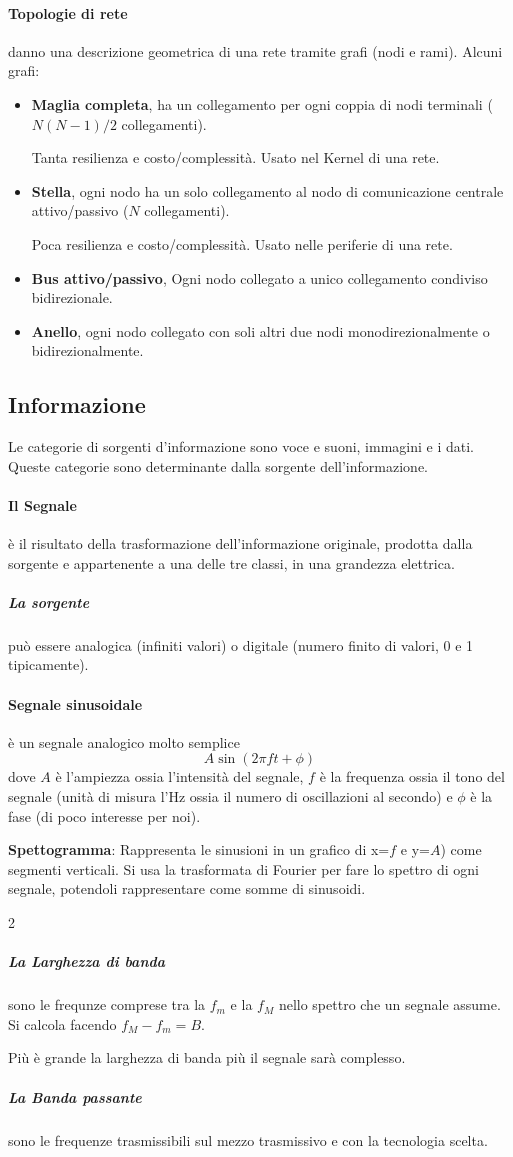 \paragraph{Topologie di rete} danno una descrizione geometrica di una rete tramite grafi (nodi e rami). Alcuni grafi:
\begin{itemize}
	\item \textbf{Maglia completa}, ha un collegamento per ogni coppia di nodi terminali ($N(N-1)/2$ collegamenti).

	Tanta resilienza e costo/complessità. Usato nel Kernel di una rete.
	\item \textbf{Stella}, ogni nodo ha un solo collegamento al nodo di comunicazione centrale attivo/passivo ($N$ collegamenti).

	Poca resilienza e costo/complessità. Usato nelle periferie di una rete.
	\item \textbf{Bus attivo/passivo}, Ogni nodo collegato a unico collegamento condiviso bidirezionale.
	\item \textbf{Anello}, ogni nodo collegato con soli altri due nodi monodirezionalmente o bidirezionalmente.
\end{itemize}
\subsection{Informazione}
Le categorie di sorgenti d'informazione sono voce e suoni, immagini e i dati. Queste categorie sono determinante dalla sorgente dell'informazione.
\paragraph{Il Segnale} è il risultato della trasformazione dell'informazione originale, prodotta dalla sorgente e appartenente a una delle tre classi, in una grandezza elettrica.
\subparagraph{La sorgente} può essere analogica (infiniti valori) o digitale (numero finito di valori, 0 e 1 tipicamente).

\paragraph{Segnale sinusoidale} è un segnale analogico molto semplice \[A\sin(2\pi ft + \phi)\] dove $A$ è l'ampiezza ossia l'intensità del segnale, $f$ è la frequenza ossia il tono del segnale (unità di misura l'Hz ossia il numero di oscillazioni al secondo) e $\phi$ è la fase (di poco interesse per noi).

\textbf{Spettogramma}: Rappresenta le sinusioni in un grafico di x=$f$ e  y=$A$) come segmenti verticali. Si usa la trasformata di Fourier per fare lo spettro di ogni segnale, potendoli rappresentare come somme di sinusoidi.
\begin{paracol}{2}
	\subparagraph{La Larghezza di banda} sono le frequnze comprese tra la $f_m$ e la $f_M$ nello spettro che un segnale assume. Si calcola facendo $f_M-f_m=B$.

	Più è grande la larghezza di banda più il segnale sarà complesso.
	\switchcolumn
	\subparagraph{La Banda passante} sono le frequenze trasmissibili sul mezzo trasmissivo e con la tecnologia scelta.
\end{paracol}

